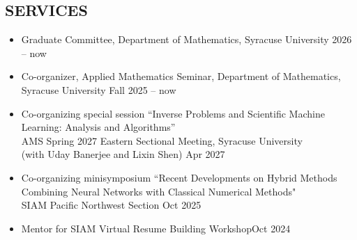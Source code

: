 \documentclass[11pt]{res}
\begin{document}
\begin{resume}
\section{SERVICES}
\begin{itemize}
\item Graduate Committee, Department of Mathematics, Syracuse University \hfill 2026 -- now
\item Co-organizer, Applied Mathematics Seminar, Department of Mathematics, Syracuse University \hfill Fall 2025 -- now
\item Co-organizing special session ``Inverse Problems and Scientific Machine Learning: Analysis and Algorithms''\\
AMS Spring 2027 Eastern Sectional Meeting, Syracuse University\\
(with Uday Banerjee and Lixin Shen) \hfill Apr 2027
\item Co-organizing minisymposium ``Recent Developments on Hybrid Methods Combining Neural Networks with Classical Numerical Methods"\\
SIAM Pacific Northwest Section \hfill Oct 2025
\item Mentor for SIAM Virtual Resume Building Workshop\hfill Oct 2024
\end{itemize}




\end{resume}
\end{document}
